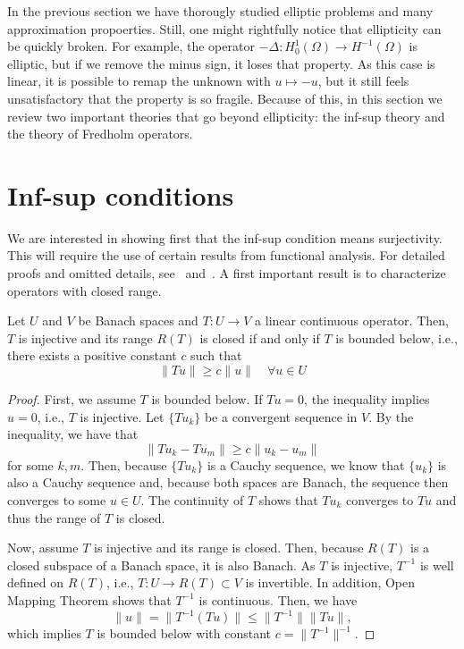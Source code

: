 In the previous section we have thorougly studied elliptic problems and many approximation propoerties. Still, one might rightfully notice that ellipticity can be quickly broken. For example, the operator $-\Delta: H_0^1(\Omega)\to H^{-1}(\Omega)$ is elliptic, but if we remove the minus sign, it loses that property. As this case is linear, it is possible to remap the unknown with $u\mapsto -u$, but it still feels unsatisfactory that the property is so fragile. Because of this, in this section we review two important theories that go beyond ellipticity: the inf-sup theory and the theory of Fredholm operators.
\section{Inf-sup conditions}\label{sec:inf-sup}
We are interested in showing first that the inf-sup condition means surjectivity. This will require the use of certain results from functional analysis. For detailed proofs and omitted details, see~\cite{chen2024infSup} and~\cite{gatica2014simple}. A first important result is to characterize operators with closed range. 
\begin{lemma}
    Let $U$ and $ V$ be Banach spaces and $T:U\to V$ a linear continuous operator. Then, $T$ is injective and its range $R(T)$ is closed if and only if  $T$ is bounded below, i.e., there exists a positive constant $c$ such that 
    \begin{equation}
        \| Tu \| \ge c\| u \|\quad \forall u\in U
    \end{equation}
    \begin{proof}
        First, we assume $T$ is bounded below. If $Tu=0$, the inequality implies $u=0$, i.e., $T$ is injective. Let $\{Tu_k\}$ be a convergent sequence in $V$. By the inequality, we have that
        \begin{equation}
            \| Tu_k - Tu_m \| \ge c\| u_k - u_m \|
        \end{equation}
        for some $k,m$. Then, because $\{Tu_k\}$ is a Cauchy sequence, we know that $\{u_k\}$ is also a Cauchy sequence and, because both spaces are Banach, the sequence then converges to some $u\in U$. The continuity of $T$ shows that $Tu_k$ converges to $Tu$ and thus the range of $T$ is closed. 

        Now, assume $T$ is injective and its range is closed. Then, because $R(T)$ is a closed subspace of a Banach space, it is also Banach. As $ T$ is injective, $T^{-1}$ is well defined on $R(T)$, i.e., $T:U\to R(T)\subset V$ is invertible. In addition, Open Mapping Theorem shows that $T^{-1}$ is continuous. Then, we have
        \begin{equation}
            \| u \| = \| T^{-1}(Tu) \| 
            \le \| T^{-1} \| \| Tu \|,
        \end{equation}
        which implies $T$ is bounded below with constant $c = \| T^{-1} \|^{-1}$.
    \end{proof}
\end{lemma}

